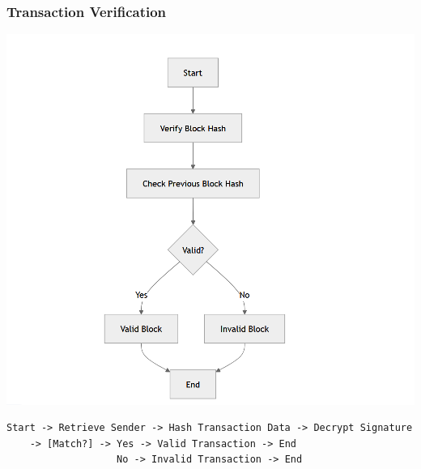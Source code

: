 \documentclass[12pt]{article}
\begin{document}
\subsubsection{Transaction Verification}
\includegraphics[]{images/5_4_2.PNG}
\begin{verbatim}
Start -> Retrieve Sender -> Hash Transaction Data -> Decrypt Signature
    -> [Match?] -> Yes -> Valid Transaction -> End
                   No -> Invalid Transaction -> End
\end{verbatim}
\end{document}
